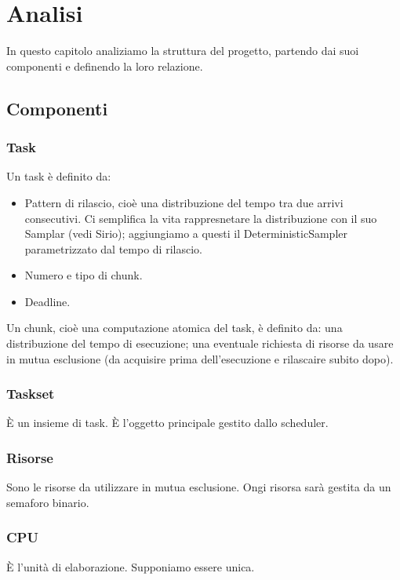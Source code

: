 \chapter{Analisi}
In questo capitolo analiziamo la struttura del progetto, partendo dai suoi componenti e definendo la loro relazione.

\section{Componenti}

\subsection{Task}
Un task è definito da:
\begin{itemize}
    \item Pattern di rilascio, cioè una distribuzione del tempo tra due arrivi consecutivi. Ci semplifica la vita rappresnetare la distribuzione con il suo Samplar (vedi Sirio); aggiungiamo a questi il DeterministicSampler parametrizzato dal tempo di rilascio.
    \item Numero e tipo di chunk.
    \item Deadline.
\end{itemize}

\myskip

Un chunk, cioè una computazione atomica del task, è definito da: una distribuzione del tempo di esecuzione; una eventuale richiesta di risorse da usare in mutua esclusione (da acquisire prima dell'esecuzione e rilascaire subito dopo).

\subsection{Taskset}
È un insieme di task. È l'oggetto principale gestito dallo scheduler.

\subsection{Risorse}
Sono le risorse da utilizzare in mutua esclusione. Ongi risorsa sarà gestita da un semaforo binario.

\subsection{CPU}
È l'unità di elaborazione. Supponiamo essere unica.

